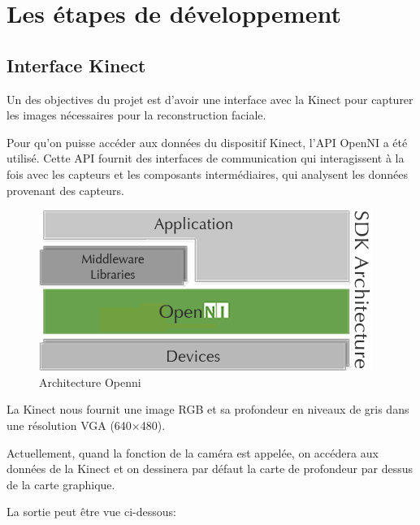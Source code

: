 \documentclass[a4paper,12pt]{article}
\begin{document}
\section{Les étapes de développement}
\subsection*{Interface Kinect}

Un des objectives du projet est d’avoir une interface avec la Kinect
pour capturer les images nécessaires pour la reconstruction faciale.

Pour qu’on puisse accéder aux données du dispositif Kinect, l’API
OpenNI\cite{Openni2010} a été utilisé. Cette API fournit des
interfaces de communication qui interagissent à la fois avec les
capteurs et les composants intermédiaires, qui analysent les données
provenant des capteurs.

\begin{figure}[h!]
  \begin{center}
    \includegraphics[scale=0.4]{img/image03.png}
    \caption{Architecture Openni}
  \end{center}
\end{figure}


La Kinect nous fournit une image RGB et sa profondeur en niveaux de
gris dans une résolution VGA (640×480).

Actuellement, quand la fonction de la caméra est appelée, on accédera
aux données de la Kinect et on dessinera par défaut la carte de
profondeur par dessus de la carte graphique. 



La sortie peut être vue ci-dessous:
\end{document}
